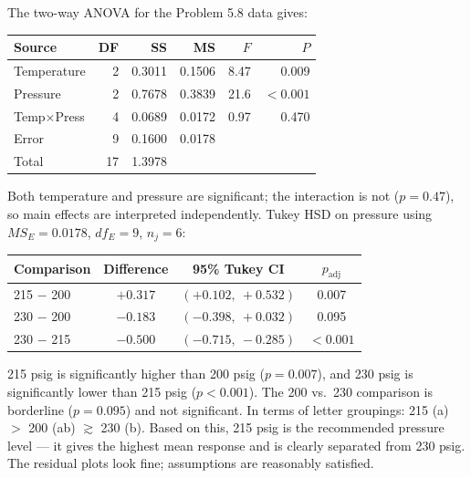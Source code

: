 \documentclass[answers,12pt,addpoints]{exam}
\begin{document}
\begin{solution}
The two-way ANOVA for the Problem 5.8 data gives:

\begin{center}
\begin{tabular}{lrrrrr}
\hline
Source              & DF &  SS     &  MS     & $F$    & $P$     \\
\hline
Temperature         &  2 & 0.3011  & 0.1506  & 8.47   & 0.009   \\
Pressure            &  2 & 0.7678  & 0.3839  & 21.6   & $<0.001$ \\
Temp$\times$Press   &  4 & 0.0689  & 0.0172  & 0.97   & 0.470   \\
Error               &  9 & 0.1600  & 0.0178  &        &         \\
\hline
Total               & 17 & 1.3978  &         &        &         \\
\hline
\end{tabular}
\end{center}

Both temperature and pressure are significant; the interaction is not ($p = 0.47$), so main effects are interpreted independently. Tukey HSD on pressure using $MS_E = 0.0178$, $df_E = 9$, $n_j = 6$:

\begin{center}
\begin{tabular}{lccc}
\hline
Comparison      & Difference & 95\% Tukey CI            & $p_{\text{adj}}$ \\
\hline
215 $-$ 200     & $+0.317$   & $(+0.102,\ +0.532)$      & 0.007            \\
230 $-$ 200     & $-0.183$   & $(-0.398,\ +0.032)$      & 0.095            \\
230 $-$ 215     & $-0.500$   & $(-0.715,\ -0.285)$      & $<0.001$         \\
\hline
\end{tabular}
\end{center}

215 psig is significantly higher than 200 psig ($p = 0.007$), and 230 psig is significantly lower than 215 psig ($p < 0.001$). The 200 vs.\ 230 comparison is borderline ($p = 0.095$) and not significant. In terms of letter groupings: 215 (a) $>$ 200 (ab) $\gtrsim$ 230 (b). Based on this, 215 psig is the recommended pressure level — it gives the highest mean response and is clearly separated from 230 psig. The residual plots look fine; assumptions are reasonably satisfied.

\end{solution}
\end{document}
